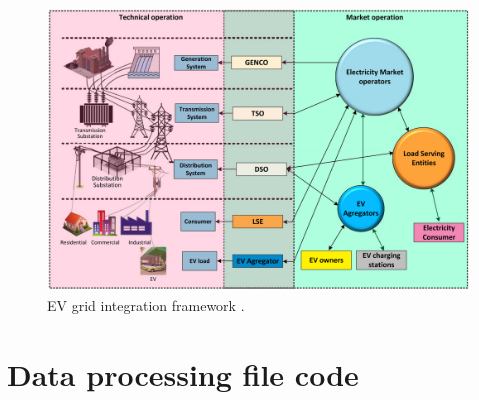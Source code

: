\documentclass[a4paper,10pt]{report}
\begin{document}
\begin{figure}[htpb]
	\centering
	\includegraphics[width=\linewidth]{ev_grid_integ_net}
	\caption[]{EV grid integration framework \cite{Das2020}.}
	\label{ev_grid_integ_net}
\end{figure}


\newpage
\section*{Data processing file code}

\end{document}
